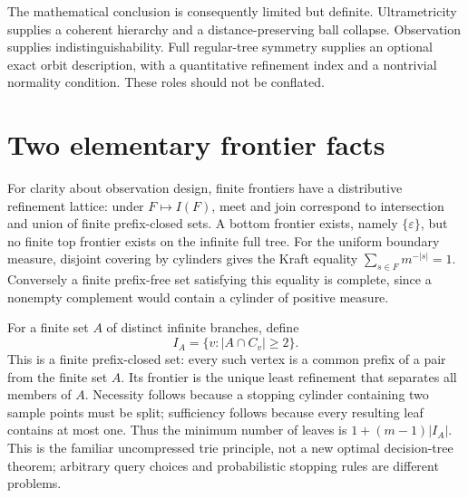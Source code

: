 \documentclass[11pt]{article}
\theoremstyle{definition}
\theoremstyle{remark}
\newcommand{\eps}{\varepsilon}
\begin{document}
The mathematical conclusion is consequently limited but definite. Ultrametricity supplies a coherent hierarchy and a distance-preserving ball collapse. Observation supplies indistinguishability. Full regular-tree symmetry supplies an optional exact orbit description, with a quantitative refinement index and a nontrivial normality condition. These roles should not be conflated.

\appendix
\section{Two elementary frontier facts}\label{sec:appendix}
For clarity about observation design, finite frontiers have a distributive refinement lattice: under $F\mapsto I(F)$, meet and join correspond to intersection and union of finite prefix-closed sets. A bottom frontier exists, namely $\{\eps\}$, but no finite top frontier exists on the infinite full tree. For the uniform boundary measure, disjoint covering by cylinders gives the Kraft equality
$\sum_{s\in F}m^{-|s|}=1$.
Conversely a finite prefix-free set satisfying this equality is complete, since a nonempty complement would contain a cylinder of positive measure.

For a finite set $A$ of distinct infinite branches, define
\[
 I_A=\{v:|A\cap C_v|\geq2\}.
\]
This is a finite prefix-closed set: every such vertex is a common prefix of a pair from the finite set $A$. Its frontier is the unique least refinement that separates all members of $A$. Necessity follows because a stopping cylinder containing two sample points must be split; sufficiency follows because every resulting leaf contains at most one. Thus the minimum number of leaves is $1+(m-1)|I_A|$. This is the familiar uncompressed trie principle, not a new optimal decision-tree theorem; arbitrary query choices and probabilistic stopping rules are different problems.

\printbibliography
\end{document}
